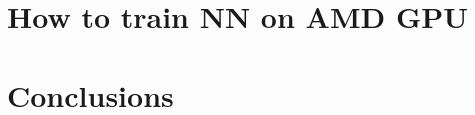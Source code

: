 \documentclass{article}
\begin{document}

\section{How to train NN on AMD GPU}
\label{sec:AMD}


\section{Conclusions}
\label{sec:end}



%





\end{document}
